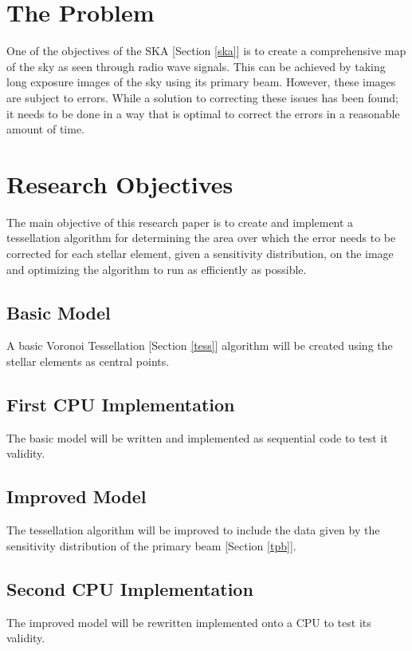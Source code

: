 \section{The Problem}
One of the objectives of the SKA [Section \ref{ska}] is to create a comprehensive map of the sky as seen through radio wave signals. This can be achieved by taking long exposure images of the sky using its primary beam. However, these images are subject to errors. While a solution to correcting these issues has been found; it needs to be done in a way that is optimal to correct the errors in a reasonable amount of time.
\section{Research Objectives}
The main objective of this research paper is to create and implement a tessellation algorithm for determining the area over which the error needs to be corrected for each stellar element, given a sensitivity distribution, on the image and optimizing the algorithm to run as efficiently as possible.
\subsection{Basic Model}
A basic Voronoi Tessellation [Section \ref{tess}] algorithm will be created using the stellar elements as central points.
\subsection{First CPU Implementation}
The basic model will be written and implemented as sequential code to test it validity.
\subsection{Improved Model}
The tessellation algorithm will be improved to include the data given by the sensitivity distribution of the primary beam [Section \ref{tpb}].
\subsection{Second CPU Implementation}
The improved model will be rewritten implemented onto a CPU to test its validity.
